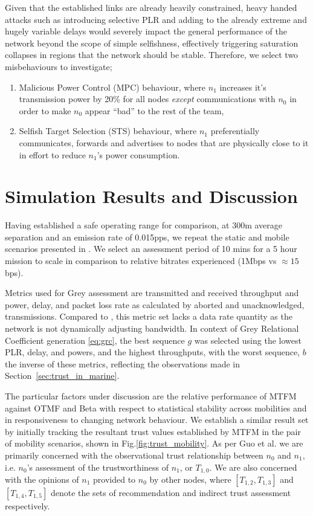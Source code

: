 \documentclass[conference]{IEEEtran}
\begin{document}
Given that the established links are already heavily constrained, heavy handed attacks such as introducing selective PLR and adding to the already extreme and hugely variable delays would severely impact the general performance of the network beyond the scope of simple selfishness, effectively triggering saturation collapses in regions that the network should be stable.
Therefore, we select two misbehaviours to investigate; 
\begin{enumerate}
  \item Malicious Power Control (MPC) behaviour, where $n_1$ increases it's transmission power by 20\% for all nodes \emph{except} communications with $n_0$ in order to make $n_0$ appear ``bad'' to the rest of the team,
  \item Selfish Target Selection (STS) behaviour, where $n_1$ preferentially communicates, forwards and advertises to nodes that are physically close to it in effort to reduce $n_1$'s power consumption.
\end{enumerate}


\section{Simulation Results and Discussion}\label{sec:trustresultsanddiscussion}

Having established a safe operating range for comparison, at 300m average separation and an emission rate of 0.015pps, we repeat the static and mobile scenarios presented in \cite{Guo11}. 
We select an assessment period of 10 mins for a 5 hour mission to scale in comparison to relative bitrates experienced (1Mbps vs $\approx15$bps).

Metrics used for Grey assessment are transmitted and received throughput and power, delay, and packet loss rate as calculated by aborted and unacknowledged, transmissions.
Compared to \cite{Guo11}, this metric set lacks a data rate quantity as the network is not dynamically adjusting bandwidth.
In context of Grey Relational Coefficient generation \eqref{eq:grc}, the best sequence $g$ was selected using the lowest PLR, delay, and powers, and the highest throughputs, with the worst sequence, $b$ the inverse of these metrics, reflecting the observations made in Section~\ref{sec:trust_in_marine}.

The particular factors under discussion are the relative performance of MTFM against OTMF and Beta with respect to statistical stability across mobilities and in responsiveness to changing network behaviour. 
We establish a similar result set by initially tracking the resultant trust values established by MTFM in the pair of mobility scenarios, shown in Fig.\ref{fig:trust_mobility}.
As per Guo et al. we are primarily concerned with the observational trust relationship between $n_0$ and $n_1$, i.e. $n_0$'s assessment of the trustworthiness of $n_1$, or $T_{1,0}$.
We are also concerned with the opinions of $n_1$ provided to $n_0$ by other nodes, where $[T_{1,2},T_{1,3}]$ and $[T_{1,4},T_{1,5}]$ denote the sets of recommendation and indirect trust assessment respectively.
\end{document}
